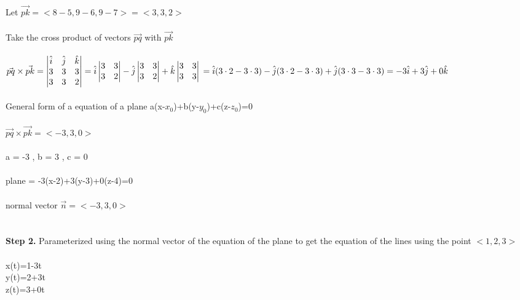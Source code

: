 \documentclass{article}
\begin{document}
\begin{enumerate}[a.]
	\\
	Let $\vec{pk} = <8-5,9-6,9-7>=<3,3,2>$\\
	\\
	Take the cross product of vectors $\vec{pq}$ with $\vec{pk}$\\
	\\
	$\vec{pq}\times\vec{pk}=\begin{vmatrix}
	\hat{i}&\hat{j}&\hat{k}\\
	3&3&3\\
	3&3&2\\
	\end{vmatrix}=\hat{i}\begin{vmatrix}
	3&3\\
	3&2\\
	\end{vmatrix}-\hat{j}\begin{vmatrix}
	3&3\\
	3&2\\
	\end{vmatrix}+\hat{k}\begin{vmatrix}
	3&3\\
	3&3\\
	\end{vmatrix}\\
	=\hat{i}(3 \cdot 2-3 \cdot3)-\hat{j}(3\cdot2-3\cdot3)+\hat{j}(3\cdot3-3\cdot3)
	\\=-3\hat{i}+3\hat{j}+0\hat{k}$\\
	\\
	General form of a equation of a plane a(x-$x_{0}$)+b(y-$y_{0}$)+c(z-$z_{0}$)=0\\
	\\
	$\vec{pq}\times\vec{pk}=<-3,3,0>$\\
	\\
	a = -3 , b = 3 , c = 0\\
	\\
	plane = -3(x-2)+3(y-3)+0(z-4)=0
	\\
	\\
	normal vector $\vec{n}=<-3,3,0>$ \\
	\\
	\\
	\textbf{Step 2.} Parameterized using the normal vector of the equation of the plane to get the equation of the lines using the point $<1,2,3>$\\
	\\
	x(t)=1-3t\\
	y(t)=2+3t\\
	z(t)=3+0t\\
	
\end{enumerate}
	
\end{document}
